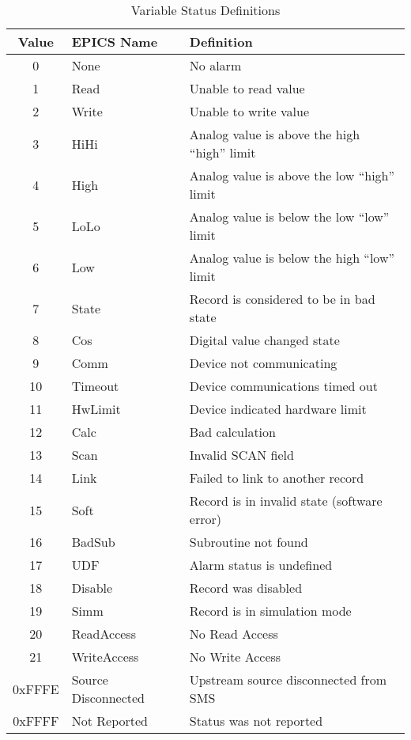 \begin{table}[h]
  \begin{center}
    \begin{tabular}{c | l | l}
	Value & EPICS Name & Definition \\
	\hline
	0 & None & No alarm \\
	1 & Read & Unable to read value \\
	2 & Write & Unable to write value \\
	3 & HiHi & Analog value is above the high ``high'' limit \\
	4 & High & Analog value is above the low ``high'' limit \\
	5 & LoLo & Analog value is below the low ``low'' limit \\
	6 & Low & Analog value is below the high ``low'' limit \\
	7 & State & Record is considered to be in bad state \\
	8 & Cos & Digital value changed state \\
	9 & Comm & Device not communicating \\
	10 & Timeout & Device communications timed out \\
	11 & HwLimit & Device indicated hardware limit \\
	12 & Calc & Bad calculation \\
	13 & Scan & Invalid SCAN field \\
	14 & Link & Failed to link to another record \\
	15 & Soft & Record is in invalid state (software error) \\
	16 & BadSub & Subroutine not found \\
	17 & UDF & Alarm status is undefined \\
	18 & Disable & Record was disabled \\
	19 & Simm & Record is in simulation mode \\
	20 & ReadAccess & No Read Access \\
	21 & WriteAccess & No Write Access \\
	0xFFFE & Source Disconnected & Upstream source disconnected from SMS \\
	0xFFFF & Not Reported & Status was not reported \\
    \end{tabular}
  \end{center}
  \caption {Variable Status Definitions}
  \label{table:protocol_variable_status_values}
\end{table}

